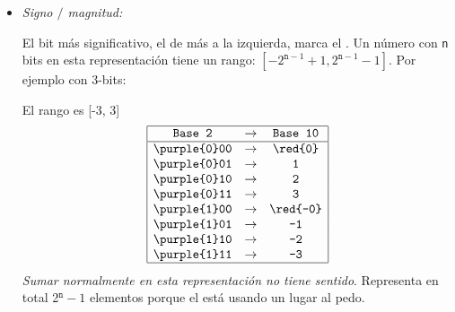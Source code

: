 \begin{itemize}[label=\iconTeoriaUno]
\begin{itemize}[label=\iconTeoriaDos]
          \item \textit{Signo $\big/$ magnitud:}\par
                El bit más significativo, el de más a la izquierda, marca el .
                Un número con \texttt{n} bits en esta representación tiene un rango: $[-2^{\texttt{n}-1}+1, 2^{\texttt{n}-1} - 1]$.
                Por ejemplo con 3-bits:\par
                El rango es [-3, 3]
                $$
                  \begin{array}{|ccc|}
                    \hline
                    \texttt{Base 2}       & \to & \texttt{Base 10}  \\
                    \hline
                    \texttt{\purple{0}00} & \to & \texttt{\red{0}}  \\
                    \texttt{\purple{0}01} & \to & \texttt{1}        \\
                    \texttt{\purple{0}10} & \to & \texttt{2}        \\
                    \texttt{\purple{0}11} & \to & \texttt{3}        \\
                    \texttt{\purple{1}00} & \to & \texttt{\red{-0}} \\
                    \texttt{\purple{1}01} & \to & \texttt{-1}       \\
                    \texttt{\purple{1}10} & \to & \texttt{-2}       \\
                    \texttt{\purple{1}11} & \to & \texttt{-3}       \\
                    \hline
                  \end{array}
                $$
                \textit{Sumar normalmente en esta representación no tiene sentido}. Representa en total 2$^\texttt{n} - 1$ elementos
                porque el  está usando un lugar al pedo.


\end{itemize}
\end{itemize}
